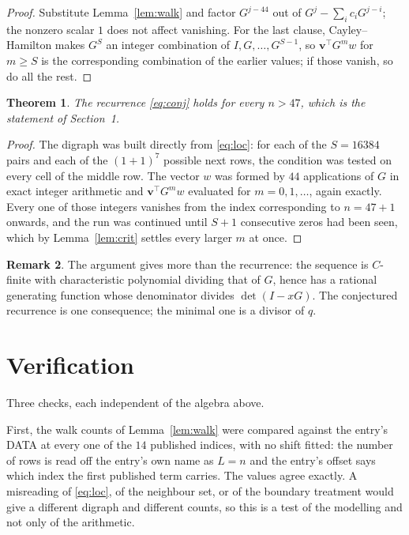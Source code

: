 \documentclass[11pt,a4paper]{article}
\theoremstyle{plain}
\newtheorem{theorem}{Theorem}
\theoremstyle{definition}
\newtheorem{remark}[theorem]{Remark}
\begin{document}
\begin{proof}
Substitute Lemma~\ref{lem:walk} and factor $G^{j-44}$ out of
$G^{j}-\sum_ic_iG^{j-i}$; the nonzero scalar $1$ does not affect
vanishing. For the last clause, Cayley--Hamilton makes $G^{S}$ an integer combination of
$I,G,\dots,G^{S-1}$, so $\mathbf{v}^{\!\top}G^{m}w$ for $m\ge S$ is the corresponding
combination of the earlier values; if those vanish, so do all the rest.
\end{proof}

\begin{theorem}
The recurrence \eqref{eq:conj} holds for every $n>47$, which is the statement of
Section~1.
\end{theorem}

\begin{proof}
The digraph was built directly from \eqref{eq:loc}: for each of the $S=16384$ pairs and each
of the $(1+1)^{7}$ possible next rows, the condition was tested on every cell of
the middle row. The vector $w$ was formed by $44$ applications of $G$ in exact integer
arithmetic and $\mathbf{v}^{\!\top}G^{m}w$ evaluated for $m=0,1,\dots$, again exactly.
Every one of those integers vanishes from the index corresponding to $n=47+1$ onwards,
and the run was continued until $S+1$ consecutive zeros had been seen, which by
Lemma~\ref{lem:crit} settles every larger $m$ at once.
\end{proof}

\begin{remark}
The argument gives more than the recurrence: the sequence is $C$-finite with characteristic
polynomial dividing that of $G$, hence has a rational generating function whose denominator
divides $\det(I-xG)$. The conjectured recurrence is one consequence; the minimal one is a
divisor of $q$.
\end{remark}

\section{Verification}

Three checks, each independent of the algebra above.

First, the walk counts of Lemma~\ref{lem:walk} were compared against the entry's DATA at
every one of the $14$ published indices, with no shift fitted: the number of rows is
read off the entry's own name as $L=n$ and the entry's offset says which index the first
published term carries. The values agree exactly. A misreading of \eqref{eq:loc}, of the
neighbour set, or of the boundary treatment would give a different digraph and different
counts, so this is a test of the modelling and not only of the arithmetic.
\end{document}
